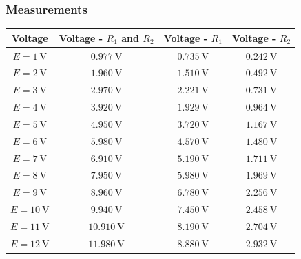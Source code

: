 \documentclass[a4paper]{article}
\begin{document}
\subsubsection{Measurements}
\begin{center}
\begin{tabular}{|c|c|c|c|}
\hline
Voltage & Voltage - $R_1$ and $R_2$ & Voltage - $R_1$ & Voltage - $R_2$\\ \hline
$E=\SI{1}{\volt}$ & $\SI{0.977}{\volt}$ & $\SI{0.735}{\volt}$ & $\SI{0.242}{\volt}$ \\ \hline
$E=\SI{2}{\volt}$ & $\SI{1.960}{\volt}$ & $\SI{1.510}{\volt}$ & $\SI{0.492}{\volt}$ \\ \hline
$E=\SI{3}{\volt}$ & $\SI{2.970}{\volt}$ & $\SI{2.221}{\volt}$ & $\SI{0.731}{\volt}$ \\ \hline
$E=\SI{4}{\volt}$ & $\SI{3.920}{\volt}$ & $\SI{1.929}{\volt}$ & $\SI{0.964}{\volt}$ \\ \hline
$E=\SI{5}{\volt}$ & $\SI{4.950}{\volt}$ & $\SI{3.720}{\volt}$ & $\SI{1.167}{\volt}$ \\ \hline
$E=\SI{6}{\volt}$ & $\SI{5.980}{\volt}$ & $\SI{4.570}{\volt}$ & $\SI{1.480}{\volt}$ \\ \hline
$E=\SI{7}{\volt}$ & $\SI{6.910}{\volt}$ & $\SI{5.190}{\volt}$ & $\SI{1.711}{\volt}$ \\ \hline
$E=\SI{8}{\volt}$ & $\SI{7.950}{\volt}$ & $\SI{5.980}{\volt}$ & $\SI{1.969}{\volt}$ \\ \hline
$E=\SI{9}{\volt}$ & $\SI{8.960}{\volt}$ & $\SI{6.780}{\volt}$ & $\SI{2.256}{\volt}$ \\ \hline
$E=\SI{10}{\volt}$ & $\SI{9.940}{\volt}$ & $\SI{7.450}{\volt}$ & $\SI{2.458}{\volt}$ \\ \hline
$E=\SI{11}{\volt}$ & $\SI{10.910}{\volt}$ & $\SI{8.190}{\volt}$ & $\SI{2.704}{\volt}$ \\ \hline
$E=\SI{12}{\volt}$ & $\SI{11.980}{\volt}$ & $\SI{8.880}{\volt}$ & $\SI{2.932}{\volt}$ \\ \hline

\end{tabular}
\end{center}
\end{document}
